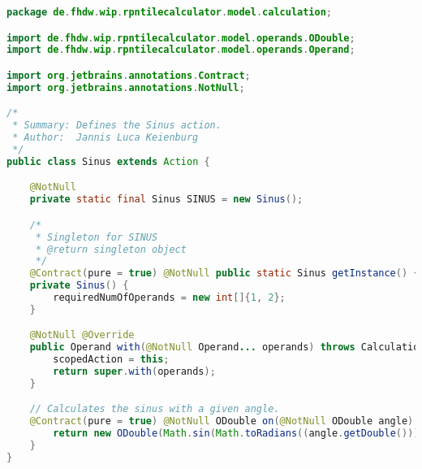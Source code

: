 \begin{lstlisting}[caption=Sinus (Keienburg),label=list:Sinus,language=Java]
package de.fhdw.wip.rpntilecalculator.model.calculation;

import de.fhdw.wip.rpntilecalculator.model.operands.ODouble;
import de.fhdw.wip.rpntilecalculator.model.operands.Operand;

import org.jetbrains.annotations.Contract;
import org.jetbrains.annotations.NotNull;

/*
 * Summary: Defines the Sinus action.
 * Author:  Jannis Luca Keienburg
 */
public class Sinus extends Action {

    @NotNull
    private static final Sinus SINUS = new Sinus();

    /*
     * Singleton for SINUS
     * @return singleton object
     */
    @Contract(pure = true) @NotNull public static Sinus getInstance() { return SINUS; }
    private Sinus() {
        requiredNumOfOperands = new int[]{1, 2};
    }

    @NotNull @Override
    public Operand with(@NotNull Operand... operands) throws CalculationException {
        scopedAction = this;
        return super.with(operands);
    }

    // Calculates the sinus with a given angle.
    @Contract(pure = true) @NotNull ODouble on(@NotNull ODouble angle) {
        return new ODouble(Math.sin(Math.toRadians((angle.getDouble()))));
    }
}
\end{lstlisting}    

